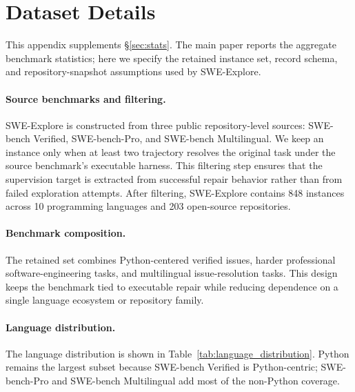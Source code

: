 \appendix

\section{Dataset Details}
\label{app:datasets}

This appendix supplements \S\ref{sec:stats}. The main paper reports the aggregate
benchmark statistics; here we specify the retained instance set, record schema,
and repository-snapshot assumptions used by SWE-Explore.

\paragraph{Source benchmarks and filtering.}
SWE-Explore is constructed from three public repository-level sources:
SWE-bench Verified, SWE-bench-Pro, and SWE-bench Multilingual. We keep an
instance only when at least two trajectory resolves the
original task under the source benchmark's executable harness. This filtering
step ensures that the supervision target is extracted from successful repair
behavior rather than from failed exploration attempts. After filtering,
SWE-Explore contains 848 instances across 10 programming languages and 203
open-source repositories.

\paragraph{Benchmark composition.}
The retained set combines Python-centered verified issues, harder professional
software-engineering tasks, and multilingual issue-resolution tasks. This design
keeps the benchmark tied to executable repair while reducing dependence on a
single language ecosystem or repository family.

\paragraph{Language distribution.}
The language distribution is shown in Table~\ref{tab:language_distribution}.
Python remains the largest subset because SWE-bench Verified is Python-centric;
SWE-bench-Pro and SWE-bench Multilingual add most of the non-Python coverage.


